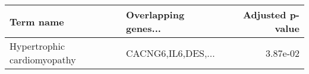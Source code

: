 \begin{tabular}{llr}
\toprule
                  Term name & Overlapping genes... &  Adjusted p-value \\
\midrule
Hypertrophic cardiomyopathy &   CACNG6,IL6,DES,... &          3.87e-02 \\
\bottomrule
\end{tabular}
